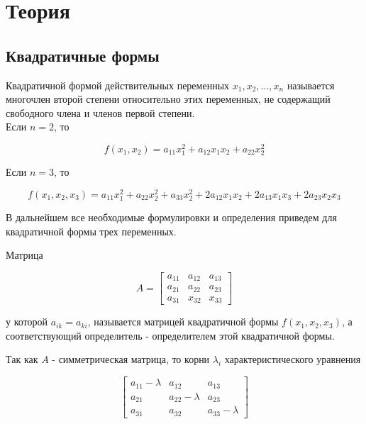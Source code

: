 \newpage

\section{Теория}

    \subsection{Квадратичные формы}

        Квадратичной формой действительных переменных $x_{1}, x_{2}, \ldots, x_{n}$ называется многочлен второй степени относительно этих переменных, не содержащий свободного члена и членов первой степени. \\

        Если $n = 2$, то 

        \[
            f \left( x_{1}, x_{2} \right) = a_{11} x^{2}_{1} + a_{12} x_{1} x_{2} + a_{22} x^{2}_{2}
        \]

        Если $n = 3$, то 

        \[
            f \left( x_{1}, x_{2}, x_{3} \right) = a_{11} x^{2}_{1} + a_{22} x^{2}_{2} + a_{33} x^{2}_{2} + 2 a_{12} x_{1} x_{2} + 2 a_{13} x_{1} x_{3} + 2 a_{23} x_{2} x_{3}
        \]

        В дальнейшем все необходимые формулировки и определения приведем для квадратичной формы трех переменных.

        Матрица

        \[
            A =
                \begin{bmatrix}
                    a_{11} & a_{12} & a_{13} \\
                    a_{21} & a_{22} & a_{23} \\
                    a_{31} & x_{32} & x_{33}
                \end{bmatrix}
        \]

        у которой $a_{ik} = a_{ki}$, называется матрицей квадратичной формы $f \left( x_{1}, x_{2}, x_{3} \right)$, а соответствующий определитель - определителем этой квадратичной формы.

        Так как $A$ - симметрическая матрица, то корни $\lambda_{i}$ характеристического уравнения

        \[
            \begin{bmatrix}
                a_{11} - \lambda & a_{12} & a_{13} \\
                a_{21} & a_{22} - \lambda & a_{23} \\
                a_{31} & a_{32} & a_{33} - \lambda
            \end{bmatrix}
        \]

